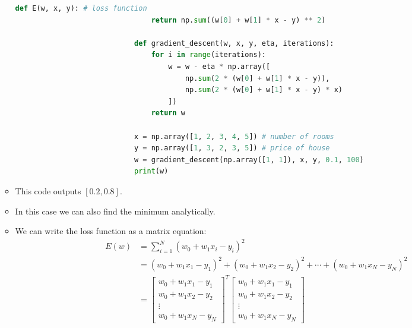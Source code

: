 \documentclass[12pt]{article}
\begin{document}
\begin{itemize}
\begin{itemize}
\begin{lstlisting}[language=Python,gobble=28]
                            def E(w, x, y): # loss function
                                return np.sum((w[0] + w[1] * x - y) ** 2)

                            def gradient_descent(w, x, y, eta, iterations):
                                for i in range(iterations):
                                    w = w - eta * np.array([
                                        np.sum(2 * (w[0] + w[1] * x - y)),
                                        np.sum(2 * (w[0] + w[1] * x - y) * x)
                                    ])
                                return w

                            x = np.array([1, 2, 3, 4, 5]) # number of rooms
                            y = np.array([1, 3, 2, 3, 5]) # price of house
                            w = gradient_descent(np.array([1, 1]), x, y, 0.1, 100)
                            print(w)
                        \end{lstlisting}
                        \item This code outputs $[0.2, 0.8]$.
                        \item In this case we can also find the minimum analytically.
                        \item We can write the loss function as a matrix equation:
                        \begin{align*}
                            E(w) &= \sum_{i=1}^N {(w_0 + w_1x_i - y_i)}^2\\
                            &= {(w_0 + w_1x_1 - y_1)}^2 + {(w_0 + w_1x_2 - y_2)}^2 + \cdots + {(w_0 + w_1x_N - y_N)}^2\\
                            &= \begin{bmatrix}
                                w_0 + w_1x_1 - y_1\\
                                w_0 + w_1x_2 - y_2\\
                                \vdots\\
                                w_0 + w_1x_N - y_N
                            \end{bmatrix}^T
                            \begin{bmatrix}
                                w_0 + w_1x_1 - y_1\\
                                w_0 + w_1x_2 - y_2\\
                                \vdots\\
                                w_0 + w_1x_N - y_N
                            \end{bmatrix}\\

\end{align*}
\end{itemize}
\end{itemize}
\end{document}
